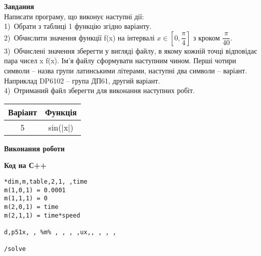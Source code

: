 \documentclass[a4paper,14pt]{extreport}
\begin{document}
\textbf{Завдання}\\
Написати програму, що виконує наступні дії:\\

1) Обрати з таблиці 1 функцію згідно варіанту.\\

2) Обчислити значення функції f(x) на інтервалі $x\in \left[0, \dfrac{\pi}{4}\right]$ з кроком $\dfrac{\pi}{40}$.\\

3) Обчислені значення зберегти у вигляді файлу, в якому кожній точці відповідає пара чисел x f(x). Ім’я файлу сформувати наступним чином. Перші чотири символи – назва групи латинськими літерами, наступні два символи – варіант. Наприклад DP6102 – група ДП61, другий варіант.\\

4) Отриманий файл зберегти для виконання наступних робіт.\\

\begin{center}
\begin{tabular}{|c|c|}
\hline
Варіант & Функція \\
\hline
5 &  sin(|x|)\\
\hline

\end{tabular}
\end{center}

\vspace{0.3cm}
\begin{center}\textbf{Виконання роботи}\end{center}
\textbf{Код на С++}\\



\begin{lstlisting}
*dim,m,table,2,1, ,time
m(1,0,1) = 0.0001
m(1,1,1) = 0
m(2,0,1) = time
m(2,1,1) = time*speed

d,p51x, , %m% , , , ,ux,, , , ,

/solve
\end{lstlisting}
\end{document}
